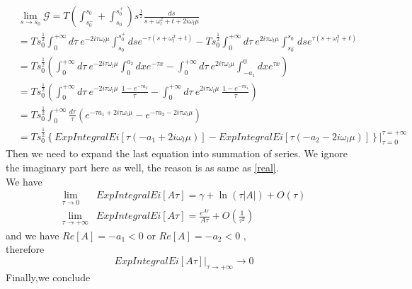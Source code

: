 \documentclass{article}
\begin{document}
\begin{equation}
    \begin{split}
    &\lim_{s\rightarrow s_0}\mathcal{G} 
    =T\left(\int_{s_0^-}^{s_0}+\int_{s_0}^{s_0^+}\right)s^{\frac{1}{2}} \frac{ds}{s+\omega_l^2+t+2i\omega_l\mu}\\
    &=T s_0^{\frac{1}{2}}
        \int_{0}^{+\infty}d\tau\ e^{-2i\tau \omega_l\mu}  \int_{s_0}^{s_0^+}ds  e^{-\tau \left(s+\omega_l^2+t\right)}
    -T s_0^{\frac{1}{2}}\int_{0}^{+\infty}d\tau\ e^{2i\tau \omega_l\mu}  \int_{s_0^-}^{s_0}ds  e^{\tau \left(s+\omega_l^2+t\right)}\\
    &=T s_0^\frac{1}{2}\left(\int_{0}^{+\infty}d\tau\ e^{-2i\tau \omega_l\mu}  \int_{0}^{a_2}dx  e^{-\tau x}-\int_{0}^{+\infty}d\tau\ e^{2i\tau \omega_l\mu}  \int_{-a_1}^{0}dx  e^{\tau x}\right)\\
    &=T s_0^\frac{1}{2}\left(\int_{0}^{+\infty}d\tau\ e^{-2i\tau \omega_l\mu}\ \frac{1-e^{-\tau a_2}}{\tau}-\int_{0}^{+\infty}d\tau\ e^{2i\tau \omega_l\mu}\ \frac{1-e^{-\tau a_1}}{\tau} \right)\\
    &=T s_0^\frac{1}{2}\int_{0}^{+\infty}\frac{d\tau}{\tau}\left(e^{-\tau a_1+2i\tau\omega_l\mu}-e^{-\tau a_2-2i\tau\omega_l\mu}\right)\\
    &= T s_0^\frac{1}{2}\left\{ExpIntegralEi[\tau\left(-a_1+2i\omega_l\mu\right)]-ExpIntegralEi[\tau\left(-a_2-2i\omega_l\mu\right)]\right\}\lvert_{\tau=0}^{\tau=+\infty}
    \end{split}   
\end{equation}
\newpage$ $\\
Then we need to expand the last equation into summation of series.
We ignore the imaginary part here as well, the reason is as same as \autoref{real}.\\
We have
\begin{equation}
    \begin{split}
\lim_{\tau\rightarrow0}&ExpIntegralEi[A\tau]=\gamma+\ln \left(\tau\left|A\right|\right)+O\left(\tau\right) \\
\lim_{\tau\rightarrow+\infty}&ExpIntegralEi[A\tau]=\frac{e^{A\tau}}{A\tau}+O\left(\frac{1}{\tau^2}\right)  
    \end{split}  
\end{equation}
and we have $Re[A]=-a_1<0$ or $Re[A]=-a_2<0$ ,\\
therefore
\begin{equation} 
    ExpIntegralEi[A\tau]\lvert_{\tau\rightarrow+\infty}\rightarrow 0 
\end{equation}
Finally,we conclude
\end{document}
